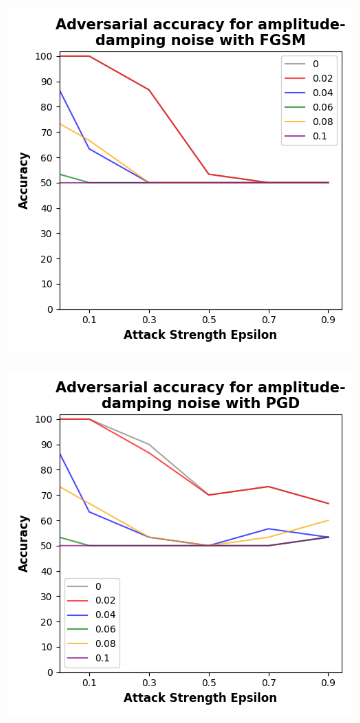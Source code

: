 \begin{figure}[!h]
  \centering

  \begin{subfigure}{0.45\textwidth}
      \includegraphics[width=\linewidth]{figures/evaluation_results/iris/pqc/figures/amplitude-damping-fgsm.png}
      \label{fig:iris5}
  \end{subfigure} \qquad
  \begin{subfigure}{0.45\textwidth}
      \includegraphics[width=\linewidth]{figures/evaluation_results/iris/pqc/figures/amplitude-damping-pgd.png}

\end{subfigure}
\end{figure}
